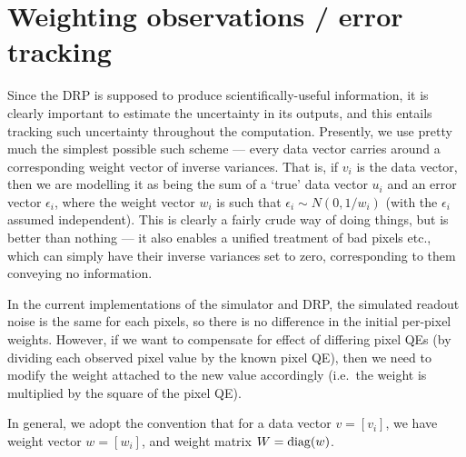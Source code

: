 \section{Weighting observations / error tracking}
\label{sec:weighting}

Since the DRP is supposed to produce scientifically-useful information,
it is clearly important to estimate the uncertainty in its outputs,
and this entails tracking such uncertainty throughout the computation.
Presently, we use pretty much the simplest possible such scheme ---
every data vector carries around a corresponding weight vector of inverse
variances. That is, if $v_i$ is the data vector, then we are modelling
it as being the sum of a `true' data vector $u_i$ and an error vector
$\epsilon_i$, where the weight vector $w_i$ is such that $\epsilon_i
\sim N(0, 1/w_i)$ (with the $\epsilon_i$ assumed independent).
This is clearly a fairly crude way of doing things, but is better
than nothing --- it also enables a unified treatment of bad pixels etc.,
which can simply have their inverse variances set to zero, corresponding
to them conveying no information.

In the current implementations of the simulator and DRP, the simulated
readout noise is the same for each pixels, so there is no difference in
the initial per-pixel weights. However, if we want to compensate for
effect of differing pixel QEs (by dividing each observed pixel value by
the known pixel QE), then we need to modify the weight attached to the
new value accordingly (i.e.\ the weight is multiplied by the square of
the pixel QE).



In general, we adopt the convention that for a data vector $v = [v_i]$, we
have weight vector $w = [w_i]$, and weight matrix $W = {\rm diag}(w)$.
